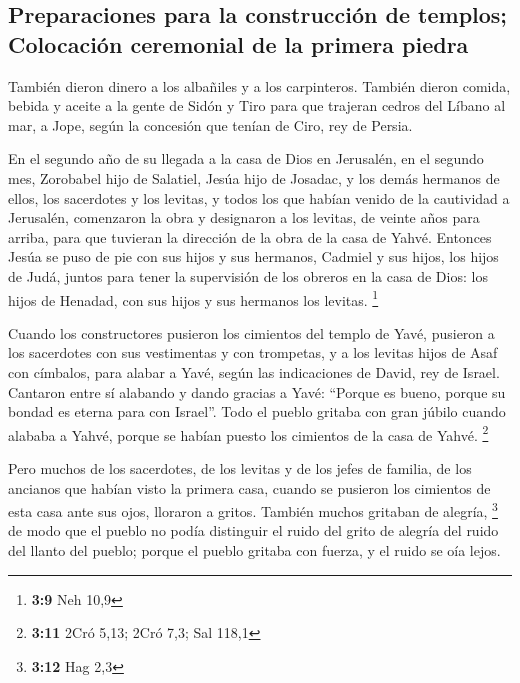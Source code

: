 \begin{paracol}{2}
\hypertarget{preparaciones-para-la-construcciuxf3n-de-templos-colocaciuxf3n-ceremonial-de-la-primera-piedra}{%
\subsection{Preparaciones para la construcción de templos; Colocación
ceremonial de la primera
piedra}\label{preparaciones-para-la-construcciuxf3n-de-templos-colocaciuxf3n-ceremonial-de-la-primera-piedra}}

 También dieron dinero a los albañiles y a los
carpinteros. También dieron comida, bebida y aceite a la gente de Sidón
y Tiro para que trajeran cedros del Líbano al mar, a Jope, según la
concesión que tenían de Ciro, rey de Persia.

 En el segundo año de su llegada a la casa de Dios en
Jerusalén, en el segundo mes, Zorobabel hijo de Salatiel, Jesúa hijo de
Josadac, y los demás hermanos de ellos, los sacerdotes y los levitas, y
todos los que habían venido de la cautividad a Jerusalén, comenzaron la
obra y designaron a los levitas, de veinte años para arriba, para que
tuvieran la dirección de la obra de la casa de Yahvé. 
Entonces Jesúa se puso de pie con sus hijos y sus hermanos, Cadmiel y
sus hijos, los hijos de Judá, juntos para tener la supervisión de los
obreros en la casa de Dios: los hijos de Henadad, con sus hijos y sus
hermanos los levitas. \footnote{\textbf{3:9} Neh 10,9}

 Cuando los constructores pusieron los cimientos del
templo de Yavé, pusieron a los sacerdotes con sus vestimentas y con
trompetas, y a los levitas hijos de Asaf con címbalos, para alabar a
Yavé, según las indicaciones de David, rey de Israel. 
Cantaron entre sí alabando y dando gracias a Yavé: ``Porque es bueno,
porque su bondad es eterna para con Israel''. Todo el pueblo gritaba con
gran júbilo cuando alababa a Yahvé, porque se habían puesto los
cimientos de la casa de Yahvé. \footnote{\textbf{3:11} 2Cró 5,13; 2Cró
  7,3; Sal 118,1}

 Pero muchos de los sacerdotes, de los levitas y de los
jefes de familia, de los ancianos que habían visto la primera casa,
cuando se pusieron los cimientos de esta casa ante sus ojos, lloraron a
gritos. También muchos gritaban de alegría, \footnote{\textbf{3:12} Hag
  2,3}  de modo que el pueblo no podía distinguir el
ruido del grito de alegría del ruido del llanto del pueblo; porque el
pueblo gritaba con fuerza, y el ruido se oía lejos.


\end{paracol}
